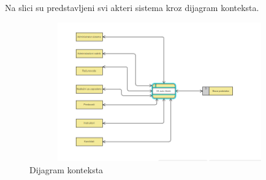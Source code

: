 Na slici  \label{fig:kontekst} su predstavljeni svi akteri sistema kroz dijagram konteksta.
\begin{figure}[H]
    \begin{center}
        \includegraphics[width=120mm, height=60mm]{Diagrams/dijagram_konteksta.png}
    \end{center}
    \caption {Dijagram konteksta}
    \label{fig:kontekst}

\end{figure}